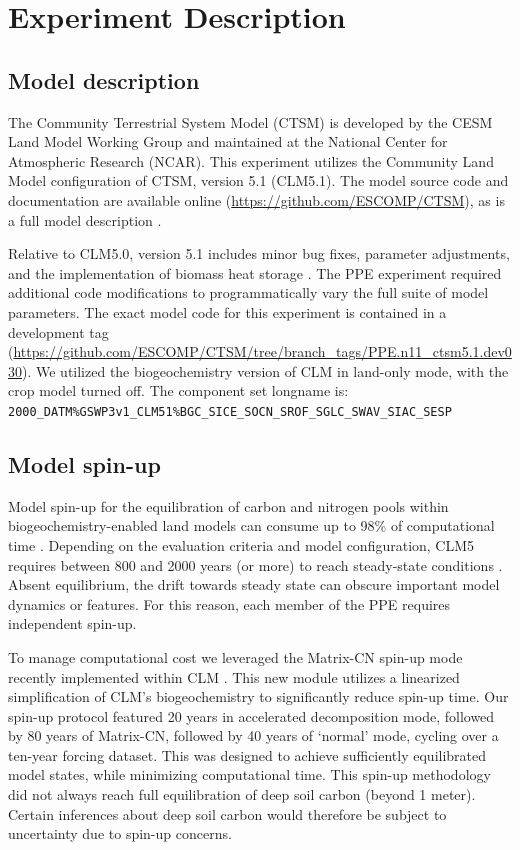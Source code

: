 \documentclass[draft]{agujournal2019}
\begin{document}
\section{Experiment Description}
\label{methods}
\subsection{Model description}
\label{sect:md}
The Community Terrestrial System Model (CTSM) is developed by the CESM Land Model Working Group and maintained at the National Center for Atmospheric Research (NCAR). This experiment utilizes the Community Land Model configuration of CTSM, version 5.1 (CLM5.1). The model source code and documentation are available online (\url{https://github.com/ESCOMP/CTSM}), as is a full model description \cite{lawrence2019}.

Relative to CLM5.0, version 5.1 includes minor bug fixes, parameter adjustments, and the implementation of biomass heat storage \cite{swenson2019}. The PPE experiment required additional code modifications to programmatically vary the full suite of model parameters. The exact model code for this experiment is contained in a development tag (\url{https://github.com/ESCOMP/CTSM/tree/branch_tags/PPE.n11_ctsm5.1.dev030}). We utilized the biogeochemistry version of CLM in land-only mode, with the crop model turned off. The component set longname is: \\ \texttt{2000\_DATM\%GSWP3v1\_CLM51\%BGC\_SICE\_SOCN\_SROF\_SGLC\_SWAV\_SIAC\_SESP}

\subsection{Model spin-up}
Model spin-up for the equilibration of carbon and nitrogen pools within biogeochemistry-enabled land models can consume up to 98\% of computational time \cite{sun2023}. Depending on the evaluation criteria and model configuration, CLM5 requires between 800 and 2000 years (or more) to reach steady-state conditions \cite{lawrence2019}. Absent equilibrium, the drift towards steady state can obscure important model dynamics or features. For this reason, each member of the PPE requires independent spin-up.

To manage computational cost we leveraged the Matrix-CN spin-up mode recently implemented within CLM \cite{lu2020}. This new module utilizes a linearized simplification of CLM's biogeochemistry to significantly reduce spin-up time. Our spin-up protocol featured 20 years in accelerated decomposition mode, followed by 80 years of Matrix-CN, followed by 40 years of `normal' mode, cycling over a ten-year forcing dataset. This was designed to achieve sufficiently equilibrated model states, while minimizing computational time. This spin-up methodology did not always reach full equilibration of deep soil carbon (beyond 1 meter). Certain inferences about deep soil carbon would therefore be subject to uncertainty due to spin-up concerns.
\end{document}
